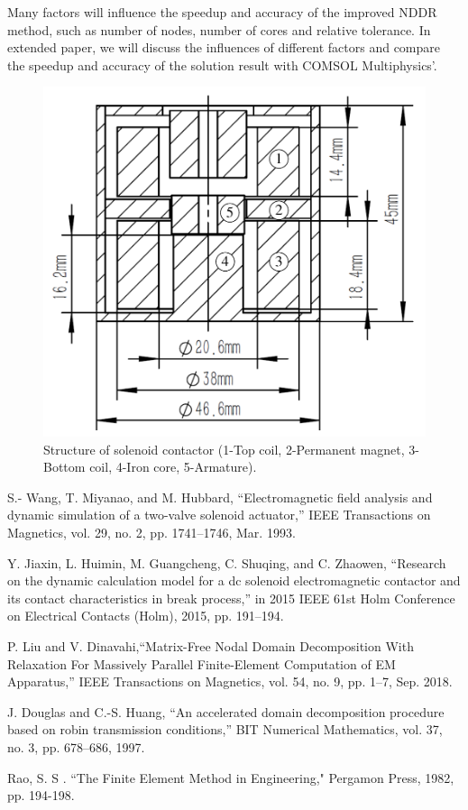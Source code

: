 \documentclass[journal,transmag]{IEEEtran}
\begin{document}
Many factors will influence the speedup and accuracy of the improved NDDR method, such as number of nodes, number of cores and relative tolerance. In extended paper, we will discuss the influences of different factors and compare the speedup and accuracy of the solution result with COMSOL Multiphysics'.
\begin{figure}
	\centering
	\includegraphics[width=0.65\linewidth]{contactor1.pdf}
	\caption{Structure of solenoid contactor (1-Top coil, 2-Permanent magnet, 3-Bottom coil, 4-Iron core, 5-Armature).}
	\label{fig:contactor}
\end{figure}


\begin{thebibliography}{1}
S.- Wang, T. Miyanao, and M. Hubbard, “Electromagnetic field analysis and dynamic simulation of a two-valve solenoid actuator,” IEEE Transactions on Magnetics, vol. 29, no. 2, pp. 1741–1746, Mar. 1993.

Y. Jiaxin, L. Huimin, M. Guangcheng, C. Shuqing, and C. Zhaowen, “Research on the dynamic calculation model for a dc solenoid electromagnetic contactor and its contact characteristics in break process,” in 2015 IEEE 61st Holm Conference on Electrical Contacts (Holm), 2015, pp. 191–194.
	

P. Liu and V. Dinavahi,``Matrix-Free Nodal Domain Decomposition With Relaxation For Massively Parallel Finite-Element Computation of EM Apparatus,” IEEE Transactions on Magnetics, vol. 54, no. 9, pp. 1–7, Sep. 2018.

J. Douglas and C.-S. Huang, “An accelerated domain decomposition procedure based on robin transmission conditions,” BIT Numerical Mathematics, vol. 37, no. 3, pp. 678–686, 1997.

Rao, S. S . ``The Finite Element Method in Engineering," Pergamon Press, 1982, pp. 194-198.

\end{thebibliography}
\end{document}
